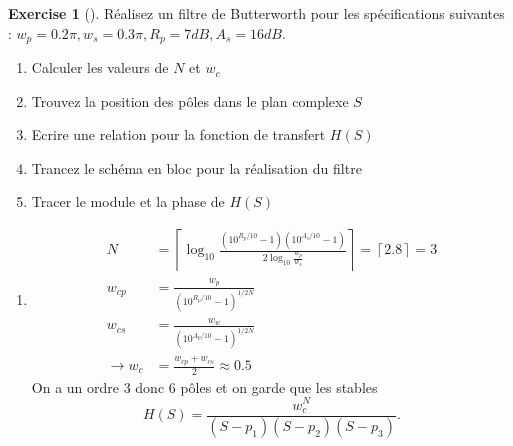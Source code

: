 \documentclass{article}
\theoremstyle{plain}%
\theoremstyle{definition}
\newtheorem{xca}[exmp]{Exercise}
\theoremstyle{remark}
\begin{document}
\begin{xca}[]
    Réalisez un filtre de Butterworth pour les spécifications suivantes : $ w_p = 0.2 \pi , w_s = 0.3 \pi , R_p = 7dB, A_s = 16 dB $. \begin{enumerate}
        \item Calculer les valeurs de $ N $ et $ w_c $ 
        \item Trouvez la position des pôles dans le plan complexe $ S $ 
        \item Ecrire une relation pour la fonction de transfert $ H(S) $ 
        \item Trancez le schéma en bloc pour la réalisation du filtre
        \item Tracer le module et la phase de $ H(S) $ 
    \end{enumerate}

    \begin{enumerate}
        \item \begin{align*}
            N &= \left\lceil \log_{10} \frac{(10^{R_p/10} - 1)(10^{A_s/10} - 1)}{2 \log_{10} \frac{w_p}{w_s}}\right\rceil = \left\lceil 2.8 \right\rceil = 3 \\
            w_{cp} &= \frac{w_p}{(10^{R_p/10} - 1)^{1/2N}} \\
            w_{cs} &= \frac{w_w}{(10^{A_p/10} - 1)^{1/2N}} \\
            \rightarrow w_c &= \frac{w_{cp} + w_{cs}}{2} \approx 0.5
        \end{align*}
        On a un ordre 3 donc 6 pôles et on garde que les stables
        \[
            H(S) = \frac{w_c^N}{(S-p_1)(S-p_2)(S-p_3)}
        .\]
        

\end{enumerate}
\end{xca}
\end{document}
